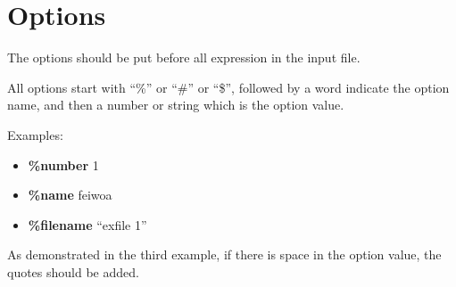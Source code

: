 \documentclass[a4paper]{article}
\begin{document}
\section{Options}
The options should be put before all expression in the input file.

All options start with ``\%'' or ``\#'' or ``\$'', followed by a word indicate the option name, and then a number or string which is the option value. 

Examples:
\begin{itemize}
\item \textbf{\%number} 1
\item \textbf{\%name} feiwoa
\item \textbf{\%filename} ``exfile 1''
\end{itemize}

As demonstrated in the third example, if there is space in the option value, the quotes should be added.
\end{document}
